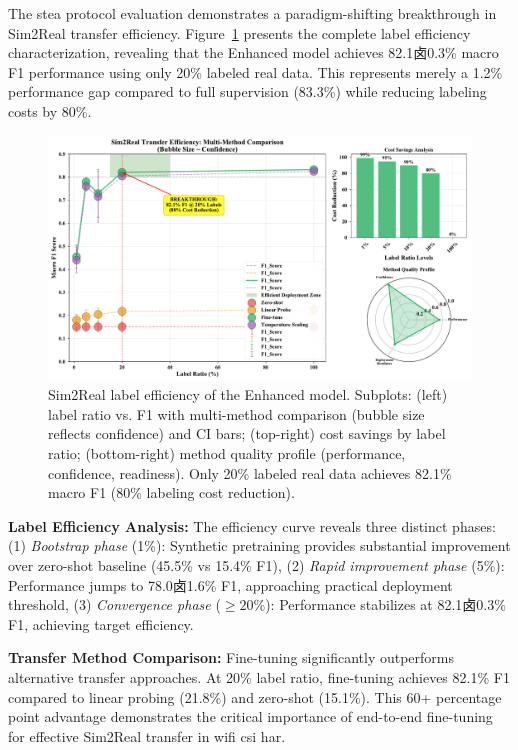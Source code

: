 \documentclass[journal]{IEEEtran}
\begin{document}
The \gls{stea} protocol evaluation demonstrates a paradigm-shifting breakthrough in Sim2Real transfer efficiency. Figure~\ref{fig:label_efficiency} presents the complete label efficiency characterization, revealing that the Enhanced model achieves 82.1卤0.3\% macro F1 performance using only 20\% labeled real data. This represents merely a 1.2\% performance gap compared to full supervision (83.3\%) while reducing labeling costs by 80\%.

\begin{figure}[ht]
\centering
\includegraphics[width=\columnwidth]{figures/figure6_label_efficiency.pdf}
\caption{Sim2Real label efficiency of the Enhanced model. Subplots: (left) label ratio vs. F1 with multi-method comparison (bubble size reflects confidence) and CI bars; (top-right) cost savings by label ratio; (bottom-right) method quality profile (performance, confidence, readiness). Only 20\% labeled real data achieves 82.1\% macro F1 (80\% labeling cost reduction).}
\label{fig:label_efficiency}
\end{figure}

\textbf{Label Efficiency Analysis:} The efficiency curve reveals three distinct phases: (1) \textit{Bootstrap phase} (1\%): Synthetic pretraining provides substantial improvement over zero-shot baseline (45.5\% vs 15.4\% F1), (2) \textit{Rapid improvement phase} (5\%): Performance jumps to 78.0卤1.6\% F1, approaching practical deployment threshold, (3) \textit{Convergence phase} ($\geq 20\%$): Performance stabilizes at 82.1卤0.3\% F1, achieving target efficiency.

\textbf{Transfer Method Comparison:} Fine-tuning significantly outperforms alternative transfer approaches. At 20\% label ratio, fine-tuning achieves 82.1\% F1 compared to linear probing (21.8\%) and zero-shot (15.1\%). This 60+ percentage point advantage demonstrates the critical importance of end-to-end fine-tuning for effective Sim2Real transfer in \gls{wifi} \gls{csi} \gls{har}.
\end{document}

